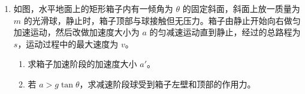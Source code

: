\documentclass[\gkver]{gaokaozhenti}
\begin{document}
\begin{enumerate}
{$p_{1}=(76-16)\UcmHg=60\UcmHg$，

末态时左右水银面高度差为

$(16-2\times3)\Ucm=10\Ucm$，

压强 $p_{2}=(76-10)\UcmHg=66\UcmHg$，

由理想气体状态方程得

$\frac{p_{1}V_{1}}{T_{1}}=\frac{p_{2}V_{2}}{T_{2}}$，

解得 $T_{2}=\frac{p_{2}V_{2}}{p_{1}V_{1}}T_{1}=\frac{66\times25}{60\times22}\times280\UK=350\UK$。

（2）设加入的水银高度为 $l$，末态时左右水银面高度差为

$h'=(16+2\times2)-l$，

由玻意耳定律得

$p_{1}V_{1}=p_{3}V_{3}$，

式中 $p_{3}=76-(20-l)$，

解得 $l=10\Ucm$。
}

\item
如图，水平地面上的矩形箱子内有一倾角为 $\theta$ 的固定斜面，斜面上放一质量为 $m$ 的光滑球，静止时，箱子顶部与球接触但无压力。箱子由静止开始向右做匀加速运动，然后改做加速度大小为 $a$ 的匀减速运动直到静止，经过的总路程为 $s$，运动过程中的最大速度为 $v$。
\begin{enumerate}
	\item
	求箱子加速阶段的加速度大小 $a'$。
	\item
	若 $a > g\tan\theta$，求减速阶段球受到箱子左壁和顶部的作用力。
\end{enumerate}
\onepicture[align=right, w=4.58cm]{}
\end{enumerate}
\end{document}
